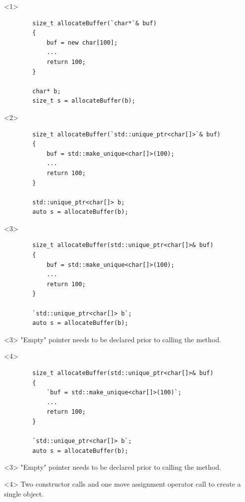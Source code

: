 \documentclass{beamer}
\begin{document}
\begin{frame}[fragile,t]
	\begin{onlyenv}
	\begin{lstlisting}
		size_t allocateBuffer(`char*`& buf)
		{
			buf = new char[100];
			...
			return 100;
		}
		
		char* b;
		size_t s = allocateBuffer(b);
	\end{lstlisting}
	\end{onlyenv}

	\begin{onlyenv}
	\begin{lstlisting}
		size_t allocateBuffer(`std::unique_ptr<char[]>`& buf)
		{
			buf = std::make_unique<char[]>(100);
			...
			return 100;
		}
		
		std::unique_ptr<char[]> b;
		auto s = allocateBuffer(b);
	\end{lstlisting}
	\end{onlyenv}
	
	\begin{onlyenv}
	\begin{lstlisting}
		size_t allocateBuffer(std::unique_ptr<char[]>& buf)
		{
			buf = std::make_unique<char[]>(100);
			...
			return 100;
		}
		
		`std::unique_ptr<char[]> b`;
		auto s = allocateBuffer(b);
	\end{lstlisting}

	\begin{block}{}<3>
		"Empty" pointer needs to be declared prior to calling the method.
	\end{block}
	\end{onlyenv}
	
	\begin{onlyenv}
	\begin{lstlisting}
		size_t allocateBuffer(std::unique_ptr<char[]>& buf)
		{
			`buf = std::make_unique<char[]>(100)`;
			...
			return 100;
		}
		
		`std::unique_ptr<char[]> b`;
		auto s = allocateBuffer(b);
	\end{lstlisting}

	\begin{block}{}<3>
		"Empty" pointer needs to be declared prior to calling the method.
	\end{block}
	\begin{block}{}<4>
		Two constructor calls and one move assignment operator call to create a single object.
	\end{block}	
	

\end{onlyenv}
\end{frame}
\end{document}
